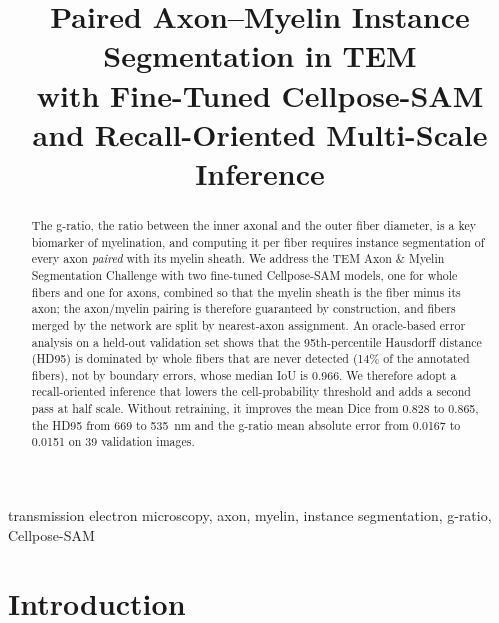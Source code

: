 \documentclass[conference]{IEEEtran}
\begin{document}
\title{Paired Axon--Myelin Instance Segmentation in TEM\\
with Fine-Tuned Cellpose-SAM and Recall-Oriented Multi-Scale Inference}

\author{
}

\maketitle

\begin{abstract}
The g-ratio, the ratio between the inner axonal and the outer fiber diameter, is
a key biomarker of myelination, and computing it per fiber requires instance
segmentation of every axon \emph{paired} with its myelin sheath. We address the
TEM Axon \& Myelin Segmentation Challenge with two fine-tuned Cellpose-SAM
models, one for whole fibers and one for axons, combined so that the myelin
sheath is the fiber minus its axon; the axon/myelin pairing is therefore
guaranteed by construction, and fibers merged by the network are split by
nearest-axon assignment. An oracle-based error analysis on a held-out
validation set shows that the 95th-percentile Hausdorff distance (HD95) is
dominated by whole fibers that are never detected (14\% of the annotated
fibers), not by boundary errors, whose median IoU is 0.966. We therefore adopt a
recall-oriented inference that lowers the cell-probability threshold and adds a
second pass at half scale. Without retraining, it improves the mean Dice from
0.828 to 0.865, the HD95 from 669 to 535~nm and the g-ratio mean absolute error
from 0.0167 to 0.0151 on 39 validation images.
\end{abstract}

\begin{IEEEkeywords}
transmission electron microscopy, axon, myelin, instance segmentation, g-ratio, Cellpose-SAM
\end{IEEEkeywords}

\section{Introduction}
\end{document}
